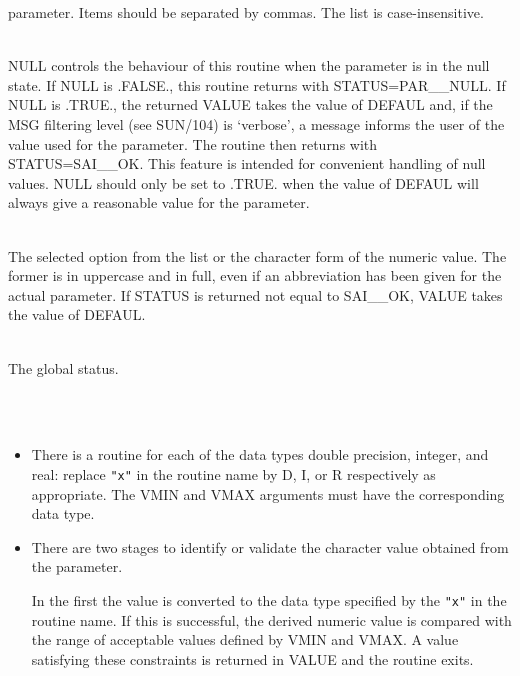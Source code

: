 \documentclass[twoside,11pt]{article}
\newcommand{\xref}[3]{#1}
\newcommand{\latex}[1]{#1}
\newcommand{\sstsubsection}[1]{ \item[{#1}] \mbox{} \\}
\newcommand{\sstnotes}[1]{\item[Notes:] \mbox{} \\[1.3ex] #1}
\newcommand{\sstitemlist}[1]{
  \mbox{} \\
  \vspace{-3.5ex}
  \begin{itemize}
     #1
  \end{itemize}
}
\newcommand{\sstitem}{\item}
\newcommand{\sstsubsection}[1]{\item[{#1}]}
\newcommand{\sstnotes}[1]{\item[Notes:] #1 }
\newcommand{\sstitemlist}[1]{
      \begin{itemize}
         #1
      \end{itemize}
      \\
   }
\newcommand{\sstitem}{\item}
\begin{document}
{{{         parameter.  Items should be separated by commas.  The list is
         case-insensitive.
      }
      \sstsubsection{
         NULL = LOGICAL (Given)
      }{
         NULL controls the behaviour of this routine when the parameter
         is in the null state.  If NULL is .FALSE., this routine
         returns with STATUS=PAR\_\_NULL.  If NULL is .TRUE., the
         returned VALUE takes the value of DEFAUL and, if the
\xref{MSG filtering level}{sun104}{conditional_message_reporting}
\latex{ (see SUN/104)} is `verbose',
         a message informs the user of the value used for
         the parameter. The routine then returns with STATUS=SAI\_\_OK. 
         This feature is intended for convenient handling of null values.
         NULL should only be set to .TRUE. when the value of DEFAUL will
         always give a reasonable value for the parameter.
      }
      \sstsubsection{
         VALUE = CHARACTER $*$ ( $*$ ) (Returned)
      }{
         The selected option from the list or the character form of the
         numeric value.  The former is in uppercase and in full, even
         if an abbreviation has been given for the actual parameter.
         If STATUS is returned not equal to SAI\_\_OK, VALUE takes the
         value of DEFAUL.
      }
      \sstsubsection{
         STATUS = INTEGER (Given and Returned)
      }{
         The global status.
      }
   }
   \sstnotes{
      \sstitemlist{

         \sstitem
         There is a routine for each of the data types double precision,
         integer, and real: replace {\tt "x"} in the routine name by D, I, or R
         respectively as appropriate.  The VMIN and VMAX arguments must
         have the corresponding data type.

         \sstitem
         There are two stages to identify or validate the character
         value obtained from the parameter.

      In the first the value is converted to the data type specified by
      the {\tt "x"} in the routine name.  If this is successful, the derived
      numeric value is compared with the range of acceptable values
      defined by VMIN and VMAX.  A value satisfying these constraints
      is returned in VALUE and the routine exits.

}}}
\end{document}
